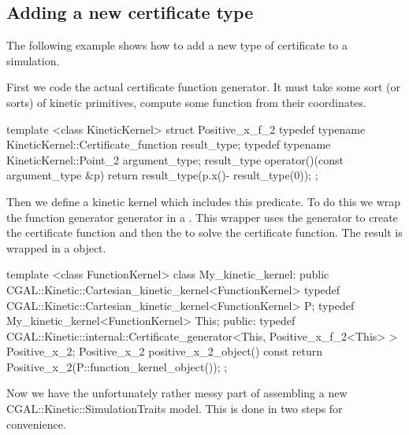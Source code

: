 \subsection{Adding a new certificate type}
\label{sec:add_cert}

The following example shows how to add a new type of certificate to a simulation. 

First we code the actual certificate function generator. It must take
some sort (or sorts) of kinetic primitives, compute some function from
their coordinates.

\begin{ccExampleCode}
template <class KineticKernel>
struct Positive_x_f_2 {
  typedef typename KineticKernel::Certificate_function result_type;
  typedef typename KineticKernel::Point_2 argument_type;
  result_type operator()(const argument_type &p){
    return result_type(p.x()- result_type(0));
  }
};
\end{ccExampleCode}

Then we define a kinetic kernel which includes this predicate. To do
this we wrap the function generator generator in a
.
This wrapper uses the generator to create the certificate function and
then the  to solve the certificate
function. The result is wrapped in a 
object.

\begin{ccExampleCode}
template <class FunctionKernel> 
class My_kinetic_kernel:
  public CGAL::Kinetic::Cartesian_kinetic_kernel<FunctionKernel> {
  typedef CGAL::Kinetic::Cartesian_kinetic_kernel<FunctionKernel> P;
  typedef My_kinetic_kernel<FunctionKernel> This;
public:
  typedef CGAL::Kinetic::internal::Certificate_generator<This, Positive_x_f_2<This> > Positive_x_2;
  Positive_x_2 positive_x_2_object() const
  {
    return Positive_x_2(P::function_kernel_object());
  }
};
\end{ccExampleCode}

Now we have the unfortunately rather messy part of assembling a new
CGAL::Kinetic::SimulationTraits model. This is done in two steps for convenience.

